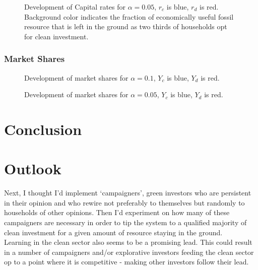 \begin{figure}[t]
	\centering
	\caption{Development of Capital rates for $\alpha=0.05$, $r_c$ is blue, $r_d$ is red. Background color indicates the fraction of economically useful fossil resource that is left in the ground as two thirds of households opt for clean investment.}

\end{figure}
\subsubsection{Market Shares}
\begin{figure}[t]
	\centering
	\caption{Development of market shares for $\alpha=0.1$, $Y_c$ is blue, $Y_d$ is red.}

\end{figure}

\begin{figure}[t]
	\centering
	\caption{Development of market shares for $\alpha=0.05$, $Y_c$ is blue, $Y_d$ is red.}

\end{figure}


\section{Conclusion}
\section{Outlook}
Next, I thought I'd implement `campaigners', green investors who are persistent in their opinion and who rewire not preferably to themselves but randomly to households of other opinions. Then I'd experiment on how many of these campaigners are necessary in order to tip the system to a qualified majority of clean investment for a given amount of resource staying in the ground. \\

Learning in the clean sector also seems to be a promising lead. This could result in a number of campaigners and/or explorative investors feeding the clean sector op to a point where it is competitive - making other investors follow their lead.

